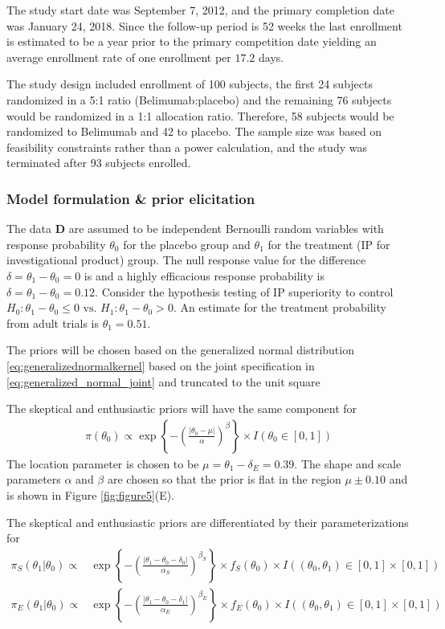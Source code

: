 \documentclass[12pt]{article}
\begin{document}
The study start date was September 7, 2012, and the primary completion date was January 24, 2018. Since the follow-up period is 52 weeks the last enrollment is estimated to be a year prior to the primary competition date yielding an average enrollment rate of one enrollment per $17.2$ days.

The study design included enrollment of 100 subjects, the first 24 subjects randomized in a 5:1 ratio (Belimumab:placebo) and the remaining 76 subjects would be randomized in a 1:1 allocation ratio. Therefore, 58 subjects would be randomized to Belimumab and 42 to placebo. The sample size was based on feasibility constraints rather than a power calculation, and the study was terminated after 93 subjects enrolled.

\subsubsection{Model formulation \& prior elicitation}
The data $\mathbf{D}$ are assumed to be independent Bernoulli random variables with response probability $\theta_0$ for the placebo group and $\theta_1$ for the treatment (IP for investigational product) group. The null response value for the difference $\delta=\theta_1-\theta_0=0$ is  and a highly efficacious response probability is $\delta=\theta_1-\theta_0=0.12$. Consider the hypothesis testing of IP superiority to control $H_0:\theta_1-\theta_0\leq 0\text{ vs. }H_1: \theta_1-\theta_0>0$. An estimate for the treatment probability from adult trials is $\theta_1=0.51$.

The priors will be chosen based on the generalized normal distribution \eqref{eq:generalizednormalkernel} based on the joint specification in \eqref{eq:generalized_normal_joint} and truncated to the unit square 

The skeptical and enthusiastic priors will have the same component for
\begin{align}
\pi(\theta_0)\propto \exp\left\{-\left(\frac{|\theta_0-\mu|}{\alpha}\right)^{\beta}\right\}\times I(\theta_0 \in [0,1])
\end{align}
The location parameter is chosen to be $\mu=\theta_1-\delta_E=0.39$. The shape and scale parameters $\alpha$ and $\beta$ are chosen so that the prior is flat in the region $\mu\pm 0.10$ and is shown in Figure \ref{fig:figure5}(E). 

The skeptical and enthusiastic priors are differentiated by their parameterizations for 
\begin{align}
\pi_S(\theta_1|\theta_0)\propto&\exp\left\{-\left(\frac{|\theta_1-\theta_0-\delta_0|}{\alpha_S}\right)^{\beta_S}\right\}\times f_S(\theta_0) \times I((\theta_0,\theta_1)\in [0,1]\times[0,1])\\
\pi_E(\theta_1|\theta_0)\propto&\exp\left\{-\left(\frac{|\theta_1-\theta_0-\delta_1|}{\alpha_E}\right)^{\beta_E}\right\}\times f_E(\theta_0) \times I((\theta_0,\theta_1)\in [0,1]\times[0,1])
\end{align}
\end{document}
